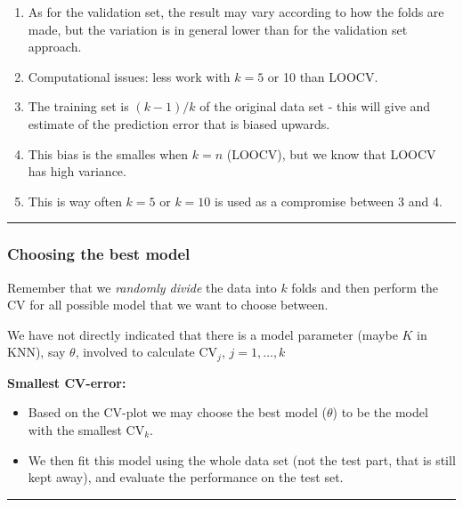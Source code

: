\documentclass[]{article}
\providecommand{\tightlist}{%
  \setlength{\itemsep}{0pt}\setlength{\parskip}{0pt}}
\begin{document}
\begin{enumerate}
\def\labelenumi{\arabic{enumi}.}
\tightlist
\item
  As for the validation set, the result may vary according to how the
  folds are made, but the variation is in general lower than for the
  validation set approach.
\item
  Computational issues: less work with \(k=5\) or 10 than LOOCV.
\item
  The training set is \((k-1)/k\) of the original data set - this will
  give and estimate of the prediction error that is biased upwards.
\item
  This bias is the smalles when \(k=n\) (LOOCV), but we know that LOOCV
  has high variance.
\item
  This is way often \(k=5\) or \(k=10\) is used as a compromise between
  3 and 4.
\end{enumerate}

\begin{center}\rule{0.5\linewidth}{\linethickness}\end{center}

\hypertarget{choosing-the-best-model}{%
\subsubsection{Choosing the best model}\label{choosing-the-best-model}}

Remember that we \emph{randomly divide} the data into \(k\) folds and
then perform the CV for all possible model that we want to choose
between.

We have not directly indicated that there is a model parameter (maybe
\(K\) in KNN), say \(\theta\), involved to calculate \(\text{CV}_j\),
\(j=1,\ldots, k\)

\textbf{Smallest CV-error:}

\begin{itemize}
\tightlist
\item
  Based on the CV-plot we may choose the best model (\(\theta\)) to be
  the model with the smallest \({\text{CV}_k}\).
\item
  We then fit this model using the whole data set (not the test part,
  that is still kept away), and evaluate the performance on the test
  set.
\end{itemize}

\begin{center}\rule{0.5\linewidth}{\linethickness}\end{center}
\end{document}
